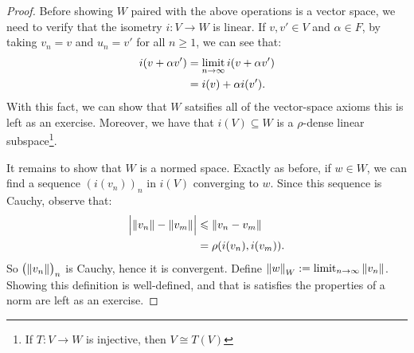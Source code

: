 \begin{proof}
            Before showing $W$ paired with the above operations is a vector space, we need to verify that the isometry $i:V \rightarrow W$ is linear. If $v,v' \in V$ and $\alpha \in F$, by taking $v_n = v$ and $u_n = v'$ for all $n\geq 1$, we can see that:
                \begin{equation*}
                \begin{split}
                    i(v + \alpha v')
                    & = \operatorname*{limit}_{n \rightarrow \infty}i(v + \alpha v') \\
                    & = i(v) + \alpha i(v').
                \end{split}
                \end{equation*}
            With this fact, we can show that $W$ satsifies all of the vector-space axioms \textemdash this is left as an exercise. Moreover, we have that $i(V) \subseteq W$ is a $\rho$-dense linear subspace\footnote{If $T:V \rightarrow W$ is injective, then $V \cong T(V)$}.

            It remains to show that $W$ is a normed space. Exactly as before, if $w \in W$, we can find a sequence $(i(v_n))_n$ in $i(V)$ converging to $w$. Since this sequence is Cauchy, observe that:
                \begin{equation*}
                \begin{split}
                    \Bigl| \left\lVert v_n \right\rVert - \left\lVert v_m \right\rVert \Bigr|
                    & \leqslant \left\lVert v_n - v_m \right\rVert \\
                    & = \rho(i(v_n),i(v_m)).
                \end{split}
                \end{equation*}
            So $\bigl(\left\lVert v_n \right\rVert\bigr)_n$ is Cauchy, hence it is convergent. Define $\left\lVert w \right\rVert_W := \operatorname*{limit}_{n \rightarrow \infty} \left\lVert v_n \right\rVert$. Showing this definition is well-defined, and that is satisfies the properties of a norm are left as an exercise.
        \end{proof}

        \begin{center}
        \end{center}

